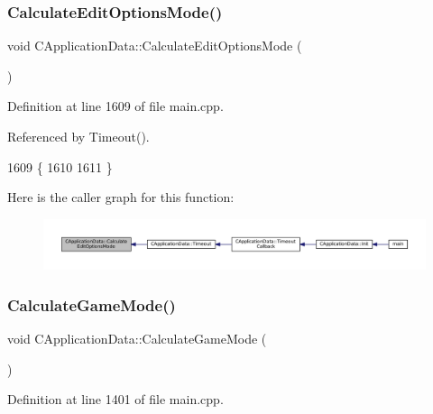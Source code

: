 \subsubsection{\texorpdfstring{Calculate\+Edit\+Options\+Mode()}{CalculateEditOptionsMode()}}
{\footnotesize\ttfamily void C\+Application\+Data\+::\+Calculate\+Edit\+Options\+Mode (\begin{DoxyParamCaption}{ }\end{DoxyParamCaption})\hspace{0.3cm}{\ttfamily [protected]}}



Definition at line 1609 of file main.\+cpp.



Referenced by Timeout().


\begin{DoxyCode}
1609                                                \{
1610 
1611 \}
\end{DoxyCode}
Here is the caller graph for this function\+:\nopagebreak
\begin{figure}[H]
\begin{center}
\leavevmode
\includegraphics[width=350pt]{classCApplicationData_a9fa1176cd629742424f29ab20c212142_icgraph}
\end{center}
\end{figure}
\hypertarget{classCApplicationData_a782d7204356ef9560deedd54320d4f16}{}\label{classCApplicationData_a782d7204356ef9560deedd54320d4f16} 
\subsubsection{\texorpdfstring{Calculate\+Game\+Mode()}{CalculateGameMode()}}
{\footnotesize\ttfamily void C\+Application\+Data\+::\+Calculate\+Game\+Mode (\begin{DoxyParamCaption}{ }\end{DoxyParamCaption})\hspace{0.3cm}{\ttfamily [protected]}}



Definition at line 1401 of file main.\+cpp.



